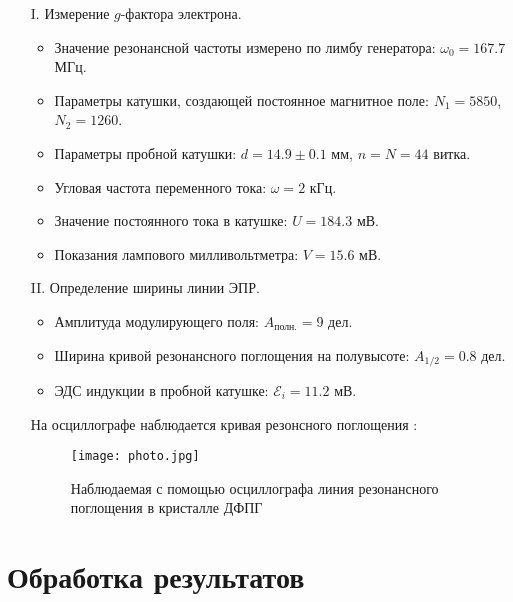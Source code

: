 \documentclass[a4paper,12pt]{article}
\begin{document}
	\begin{enumerate}
		\item[I.] Измерение $g$-фактора электрона.
		\begin{itemize}
			\item Значение резонансной частоты измерено по лимбу генератора: $\omega_{0} = 167.7$ МГц.
			\item Параметры катушки, создающей постоянное магнитное поле: $N_{1} = 5850$, $N_{2} = 1260$.
			
			\item Параметры пробной катушки: $d = 14.9\pm 0.1$ мм, $n = N = 44$ витка.
			
			\item Угловая частота переменного тока: $\omega = 2$ кГц.
			
			\item Значение постоянного тока в катушке: $U = 184.3$ мВ.
			
			\item Показания лампового милливольтметра: $V = 15.6$ мВ.
			
		\end{itemize}
	
	\item[II.] Определение ширины линии ЭПР.
		
		\begin{itemize}
			\item Амплитуда модулирующего поля: $A_{\text{полн.}} = 9$ дел.
			
			\item Ширина кривой резонансного поглощения на полувысоте: $A_{1/2} = 0.8$ дел.
			
			\item ЭДС индукции в пробной катушке: $\mathcal{E}_{i} = 11.2$ мВ.
			
		\end{itemize}
		 
		На осциллографе наблюдается кривая резонсного поглощения :
		\begin{figure}[ht]
			\centering
			\caption{Наблюдаемая с помощью осциллографа линия резонансного поглощения в кристалле ДФПГ}
			\label{pic2}
			\texttt{[image: photo.jpg]}
		\end{figure}
	\end{enumerate}

	\newpage
	
	\section{Обработка результатов}
	
\end{document}
